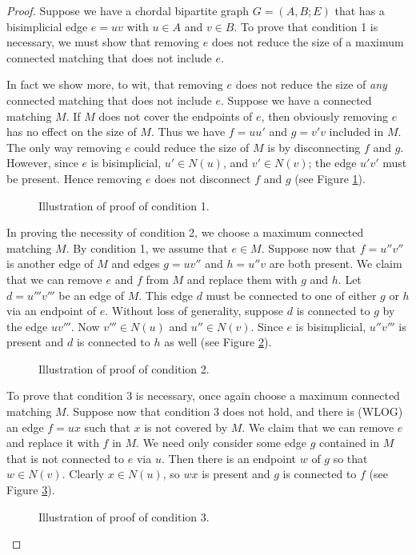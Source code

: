 \begin{proof}
Suppose we have a chordal bipartite graph $G = (A,B;E)$ that has a bisimplicial edge $e = uv$ with $u \in A$ and $v \in B$.  
%
To prove that condition 1 is necessary, we must show that removing $e$ does not reduce the size of a maximum connected matching that does not include $e$. 

In fact we show more, to wit, that removing $e$ does not reduce the size of {\it any} connected matching that does not include $e$.  
%
Suppose we have a connected matching $M$.  
%
If $M$ does not cover the endpoints of $e$, then obviously removing $e$ has no effect on the size of $M$.  
%
Thus we have $f = uu'$ and $g = v'v$ included in $M$.  
%
The only way removing $e$ could reduce the size of $M$ is by disconnecting $f$ and $g$.  
%
However, since $e$ is bisimplicial, $u' \in N(u)$, and $v' \in N(v)$; the edge $u'v'$ must be present.  
%
Hence removing $e$ does not disconnect $f$ and $g$ (see Figure \ref{first_part}).
\begin{figure}
	\begin{center}
	
	\end{center}
	\label{first_part}
	\caption{Illustration of proof of condition 1.}
\end{figure}
%
In proving the necessity of condition 2, we choose a maximum connected matching $M$.  
%
By condition 1, we assume that $e \in M$.  
%
Suppose now that $f = u''v''$ is another edge of $M$ and edges $g = uv''$ and $h = u''v$ are both present.  
%
We claim that we can remove $e$ and $f$ from $M$ and replace them with $g$ and $h$. 
%
 Let $d = u'''v'''$ be an edge of $M$.  
%
This edge $d$ must be connected to one of either $g$ or $h$ via an endpoint of $e$.  
%
Without loss of generality, suppose $d$ is connected to $g$ by the edge $uv'''$.  
%
Now $v''' \in N(u)$ and $u'' \in N(v)$.  
%
Since $e$ is bisimplicial, $u''v'''$ is present and $d$ is connected to $h$ as well (see Figure \ref{second_part}).
\begin{figure}
	\begin{center}
	
	\end{center}
	\label{second_part}
	\caption{Illustration of proof of condition 2.}
\end{figure}
%
To prove that condition 3 is necessary, once again choose a maximum connected matching $M$.  
%
Suppose now that condition 3 does not hold, and there is (WLOG) an edge $f = ux$ such that $x$ is not covered by $M$.  
%
We claim that we can remove $e$ and replace it with $f$ in $M$.  We need only consider some edge $g$ contained in $M$ that is not connected to $e$ via $u$.  
%
Then there is an endpoint $w$ of $g$ so that $w \in N(v)$.  
%
Clearly $x\in N(u)$, so $wx$ is present and $g$ is connected to $f$ (see Figure \ref{third_part}).
\begin{figure}
	\begin{center}
	
	\end{center}
	\label{third_part}
	\caption{Illustration of proof of condition 3.}
\end{figure}
\end{proof} 



